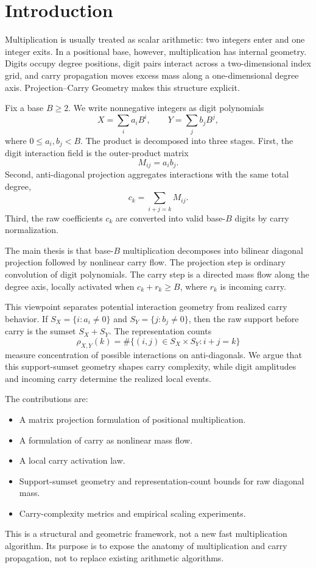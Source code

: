 \section{Introduction}

Multiplication is usually treated as scalar arithmetic: two integers enter and
one integer exits. In a positional base, however, multiplication has internal
geometry. Digits occupy degree positions, digit pairs interact across a
two-dimensional index grid, and carry propagation moves excess mass along a
one-dimensional degree axis. Projection--Carry Geometry makes this structure
explicit.

Fix a base \(B\ge 2\). We write nonnegative integers as digit polynomials
\[
    X=\sum_i a_i B^i,\qquad
    Y=\sum_j b_j B^j,
\]
where \(0\le a_i,b_j<B\). The product is decomposed into three stages. First,
the digit interaction field is the outer-product matrix
\[
    M_{ij}=a_i b_j.
\]
Second, anti-diagonal projection aggregates interactions with the same total
degree,
\[
    c_k=\sum_{i+j=k}M_{ij}.
\]
Third, the raw coefficients \(c_k\) are converted into valid base-\(B\) digits
by carry normalization.

The main thesis is that base-\(B\) multiplication decomposes into bilinear
diagonal projection followed by nonlinear carry flow. The projection step is
ordinary convolution of digit polynomials. The carry step is a directed mass
flow along the degree axis, locally activated when \(c_k+r_k\ge B\), where
\(r_k\) is incoming carry.

This viewpoint separates potential interaction geometry from realized carry
behavior. If \(S_X=\{i:a_i\ne 0\}\) and \(S_Y=\{j:b_j\ne 0\}\), then the raw
support before carry is the sumset \(S_X+S_Y\). The representation counts
\[
    \rho_{X,Y}(k)=\#\{(i,j)\in S_X\times S_Y:i+j=k\}
\]
measure concentration of possible interactions on anti-diagonals. We argue
that this support-sumset geometry shapes carry complexity, while digit
amplitudes and incoming carry determine the realized local events.

The contributions are:
\begin{itemize}
    \item[C1.] A matrix projection formulation of positional multiplication.
    \item[C2.] A formulation of carry as nonlinear mass flow.
    \item[C3.] A local carry activation law.
    \item[C4.] Support-sumset geometry and representation-count bounds for raw
    diagonal mass.
    \item[C5.] Carry-complexity metrics and empirical scaling experiments.
\end{itemize}

This is a structural and geometric framework, not a new fast multiplication
algorithm. Its purpose is to expose the anatomy of multiplication and carry
propagation, not to replace existing arithmetic algorithms.

